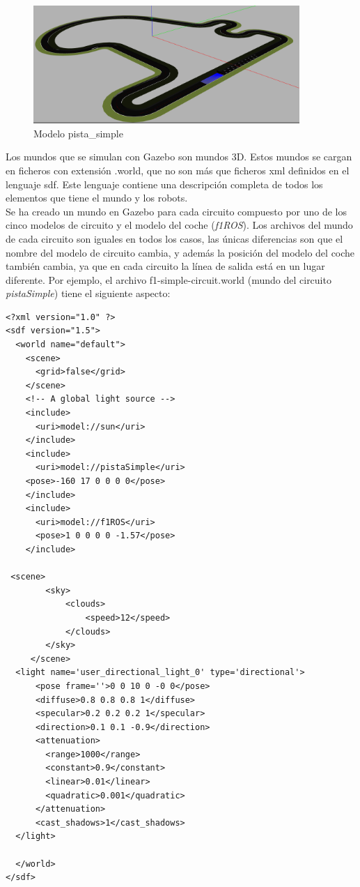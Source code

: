 \begin{figure}
  \begin{center}
    \includegraphics[width=0.9\textwidth]{figures/Infraestructura/circuit_Small.png}
		\caption{Modelo pista\_simple}
		\label{fig.small}
		\end{center}
\end{figure}

Los mundos que se simulan con Gazebo son mundos 3D. Estos mundos se cargan en ficheros con extensión .world, que no son más que ficheros \acrshort{xml} definidos en el lenguaje \acrshort{sdf}. Este lenguaje contiene una descripción completa de todos los elementos que tiene el mundo y los robots.\\

Se ha creado un mundo en Gazebo para cada circuito compuesto por uno de los cinco modelos de circuito y el modelo del coche (\textit{f1ROS}). Los archivos del mundo de cada circuito son iguales en todos los casos, las únicas diferencias son que el nombre del modelo de circuito cambia, y además la posición del modelo del coche también cambia, ya que en cada circuito la línea de salida está en un lugar diferente. Por ejemplo, el archivo f1-simple-circuit.world (mundo del circuito \textit{pistaSimple}) tiene el
siguiente aspecto:

\vspace{20pt}
\begin{lstlisting}[frame=single]
<?xml version="1.0" ?>
<sdf version="1.5">
  <world name="default">
    <scene>
      <grid>false</grid>
    </scene>
    <!-- A global light source -->
    <include>
      <uri>model://sun</uri>
    </include>
    <include>
      <uri>model://pistaSimple</uri>
	<pose>-160 17 0 0 0 0</pose>
    </include>
    <include>
      <uri>model://f1ROS</uri>
      <pose>1 0 0 0 0 -1.57</pose>
    </include>

 <scene>
        <sky>
            <clouds>
                <speed>12</speed>
            </clouds>
        </sky>
     </scene>
  <light name='user_directional_light_0' type='directional'>
      <pose frame=''>0 0 10 0 -0 0</pose>
      <diffuse>0.8 0.8 0.8 1</diffuse>
      <specular>0.2 0.2 0.2 1</specular>
      <direction>0.1 0.1 -0.9</direction>
      <attenuation>
        <range>1000</range>
        <constant>0.9</constant>
        <linear>0.01</linear>
        <quadratic>0.001</quadratic>
      </attenuation>
      <cast_shadows>1</cast_shadows>
  </light>

  </world>
</sdf>

\end{lstlisting}

